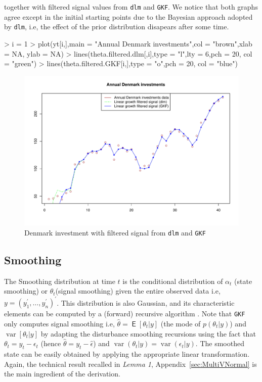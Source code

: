 \documentclass{article}
\newcommand{\GKF}{\texttt{GKF}\xspace}
\DeclareMathOperator{\var}{var}
\DeclareMathOperator{\E}{\mathsf{E}}
\begin{document}
together with filtered signal values from \texttt{dlm} and \GKF. We notice that both graphs
agree except in the initial starting points due to the Bayesian approach adopted by
\texttt{dlm}, i.e, the effect of the prior distribution disapears after some time.
\begin{Schunk}
\begin{Sinput}
> i = 1
> plot(yt[i,],main = "Annual Denmark investments",col = "brown",xlab = NA, ylab = NA)
> lines(theta.filtered.dlm[,i],type = "l",lty = 6,pch = 20, col = "green")
> lines(theta.filtered.GKF[i,],type = "o",pch = 20, col = "blue")
\end{Sinput}
\end{Schunk}
\begin{figure}[htbp]
  \centering
\includegraphics{vignette-019}
\caption{Denmark investment with filtered signal from \texttt{dlm} and \GKF}
\label{fig:LGFilter}
\end{figure}

\subsection{Smoothing}

The Smoothing distribution at time $t$ is the conditional distribution of $\alpha_t$ (state
smoothing) or $\theta_t$(signal smoothing) given the entire observed data i.e,
$y=(y_1^\prime,\dots,y_n^\prime)^\prime$. This distribution is also Gaussian, and its
characteristic elements can be computed by a (forward) recursive algorithm
\citep[see][chap. 4.5.3]{durbin2012time}. Note that \GKF only computes signal smoothing i.e,
$\hat{\theta}=\E[\theta_t|y]$ (the mode of $p(\theta_t|y)$) and $\var[\theta_t|y]$ by
adapting the disturbance smoothing recursions using the fact that
$\theta_t = y_t - \epsilon_t$ (hence $\hat{\theta}=y_t-\hat{\epsilon}$) and
$\var(\theta_t |y) = \var(\epsilon_t |y)$. The smoothed state can be easily obtained by
applying the appropriate linear transformation. Again, the technical result recalled in
\textit{Lemma 1}, Appendix~\ref{sec:MultiVNormal} is the main ingredient of the derivation.
\end{document}
